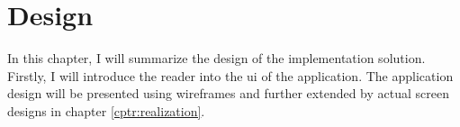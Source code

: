 \chapter{Design}\label{cptr:design}

In this chapter, I will summarize the design of the implementation solution.
Firstly, I will introduce the reader into the \gls{ui} of the application.
The application design will be presented using wireframes and further extended by actual screen designs in chapter \ref{cptr:realization}.







